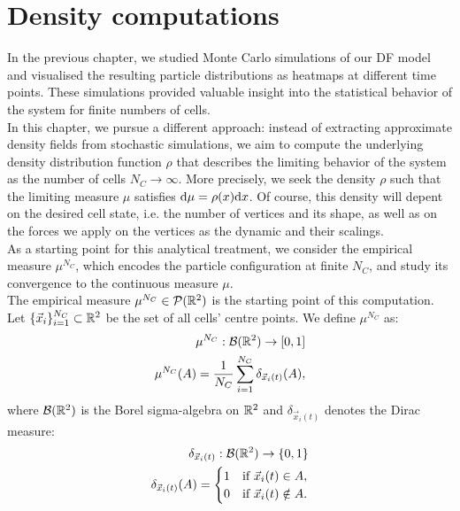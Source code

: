 \section{Density computations}
In the previous chapter, we studied Monte Carlo simulations of our DF model and visualised the resulting particle distributions as heatmaps at different time points. 
These simulations provided valuable insight into the statistical behavior of the system for finite numbers of cells. \\
In this chapter, we pursue a different approach: instead of extracting approximate density fields from stochastic simulations, we aim to compute the underlying density distribution function \( \rho \) that describes the limiting behavior of the system as the number of cells \( N_C \to \infty \). 
More precisely, we seek the density \( \rho \) such that the limiting measure \( \mu \) satisfies \( \mathrm{d} \mu = \rho(x) \mathrm{d} x \). 
Of course, this density will depent on the desired cell state, i.e. the number of vertices and its shape, as well as on the forces we apply on the vertices as the dynamic and their scalings. \\ 
As a starting point for this analytical treatment, we consider the empirical measure \( \mu^{N_C} \), which encodes the particle configuration at finite \( N_C \), and study its convergence to the continuous measure \( \mu \). \\
The empirical measure $\mu^{N_C} \in \mathcal{P}(\mathbb{R}^{2})$ is the starting point of this computation. \\
Let $\{\vec{x}_i\}_{i=1}^{N_C} \subset \mathbb{R}^2$ be the set of all cells' centre points. 
We define $\mu^{N_C}$ as:  
\begin{align*}
    \mu^{N_C}: \mathcal{B}(\mathbb{R}^2) \rightarrow [0,1]  \\
    \mu^{N_C}(A) = \frac{1}{N_C} \sum\limits_{i=1}^{N_C} \delta_{\vec{x}_i(t)}(A),
\end{align*}
where $\mathcal{B}(\mathbb{R}^2)$ is the Borel sigma-algebra on $\mathbb{R}^2$ and \( \delta_{\vec{x}_i(t)} \) denotes the Dirac measure: 
\begin{align*}
    \delta_{\vec{x}_i(t)}: \mathcal{B}(\mathbb{R}^2) \rightarrow \{0,1\}  \\
    \delta_{\vec{x}_i(t)}(A) = \begin{cases}
        1 & \text{if } \vec{x}_i(t) \in A, \\
        0 & \text{if } \vec{x}_i(t) \notin A.
   \end{cases}
\end{align*}
